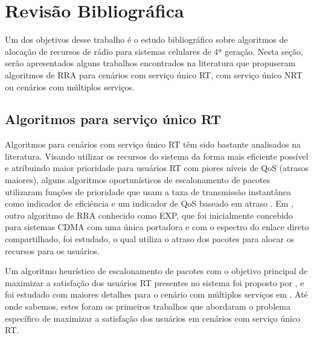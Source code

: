 \chapter[Revisão Bibliográfica]{Revisão Bibliográfica}
Um dos objetivos desse trabalho é o estudo bibliográfico sobre algoritmos de alocação de recursos de rádio para sistemas celulares de 4ª geração. Nesta seção, serão apresentados alguns trabalhos encontrados na literatura que propuseram algoritmos de RRA para cenários com serviço único RT, com serviço único NRT ou cenários com múltiplos serviços.    

\section{Algoritmos para serviço único RT}

Algoritmos para cenários com serviço único RT têm sido bastante analisados na literatura. Visando utilizar os recursos do sistema da forma mais eficiente possível e atribuindo maior prioridade para usuários RT com piores níveis de QoS (atrasos maiores), alguns algoritmos oportunísticos de escalonamento de pacotes utilizaram funções de prioridade que usam a taxa de transmissão instantânea como indicador de eficiência e um indicador de QoS baseado em atraso \cite{ho2011opportunistic,Braga2006,Gueguen2008}. Em , outro algoritmo de RRA conhecido como \ac{EXP}, que foi inicialmente concebido para sistemas \ac{CDMA} com uma única portadora e com o espectro do enlace direto compartilhado, foi estudado, o qual utiliza o atraso dos pacotes para alocar os recursos para os usuários.

Um algoritmo heurístico de escalonamento de pacotes com o objetivo principal de maximizar a satisfação dos usuários RT presentes no sistema foi proposto por , e foi estudado com maiores detalhes para o cenário com múltiplos serviços em . Até onde sabemos, estes foram os primeiros trabalhos que abordaram o problema específico de maximizar a satisfação dos usuários em cenários com serviço único RT. 


